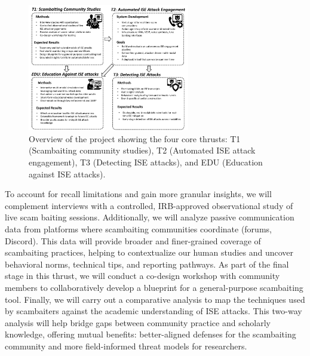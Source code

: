 \begin{figure}
  \centering
  \includegraphics[width=0.63\textwidth]{images/project_overview.pdf}
  \caption{Overview of the project showing the four core thrusts: T1 (Scambaiting community studies), T2 (Automated ISE attack engagement), T3 (Detecting ISE attacks), and EDU (Education against ISE attacks). }
  \label{fig:project_overview}
\end{figure}
To account for recall limitations and gain more granular insights, we will complement interviews with a controlled, IRB-approved observational study of live scam baiting sessions. Additionally, we will analyze passive communication data from platforms where scambaiting communities coordinate (\eg forums, Discord). This data will provide broader and finer-grained coverage of scambaiting practices, helping to contextualize our human studies and uncover behavioral norms, technical tips, and reporting pathways. As part of the final stage in this thrust, we will conduct a co-design workshop with community members to collaboratively develop a blueprint for a general-purpose scambaiting tool. Finally, we will carry out a comparative analysis to map the techniques used by scambaiters against the academic understanding of ISE attacks. This two-way analysis will help bridge gaps between community practice and scholarly knowledge, offering mutual benefits: better-aligned defenses for the scambaiting community and more field-informed threat models for researchers.


